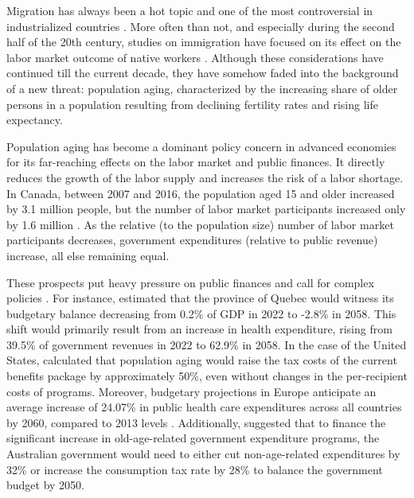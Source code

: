 Migration has always been a hot topic and one of the most controversial in industrialized countries \citep{Marois:2020je}.
More often than not, and especially during the second half of the 20th century, studies on immigration have focused on its effect on the labor market outcome of native workers \citep{picheTheoriesMigratoiresContemporaines2013,fusaroImpactImmigrationNative2018,Castles:2012vr}.
Although these considerations have continued till the current decade, they have somehow faded into the background of a new threat: population aging, characterized by the increasing share of older persons in a population resulting from declining fertility rates and rising life expectancy.

\vspace{0.7em}\par
Population aging has become a dominant policy concern in advanced economies for its far-reaching effects on the labor market and public finances.
It directly reduces the growth of the labor supply and increases the risk of a labor shortage.
In Canada, between 2007 and 2016, the population aged 15 and older increased by 3.1 million people, but the number of labor market participants increased only by 1.6 million \citep{Fields:2017wa}.
As the relative (to the population size) number of labor market participants decreases, government expenditures (relative to public revenue) increase, all else remaining equal.

\vspace{0.7em}\par
These prospects put heavy pressure on public finances and call for complex policies \citep{Godbout.2012,St-Maurice.2018uv,Lee:bKjc_XK_,Zokalj:2016bq,Kudrna:2015dr,Müller.2009}.
For instance, \citet{St-Maurice.2018uv} estimated that the province of Quebec would witness its budgetary balance decreasing from 0.2\% of GDP in 2022 to -2.8\% in 2058. This shift would primarily result from an increase in health expenditure, rising from 39.5\% of government revenues in 2022 to 62.9\% in 2058.
In the case of the United States, \citet{Lee:bKjc_XK_} calculated that population aging would raise the tax costs of the current benefits package by approximately 50\%, even without changes in the per-recipient costs of programs.
Moreover, budgetary projections in Europe anticipate an average increase of 24.07\% in public health care expenditures across all countries by 2060, compared to 2013 levels \citep{Zokalj:2016bq}.
Additionally, \citet{Kudrna:2015dr} suggested that to finance the significant increase in old-age-related government expenditure programs, the Australian government would need to either cut non-age-related expenditures by 32\% or increase the consumption tax rate by 28\% to balance the government budget by 2050.

